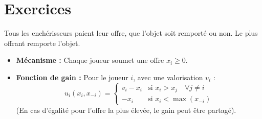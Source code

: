 \section{Exercices}

\begin{exemple}
Tous les enchérisseurs paient leur offre, que l'objet soit remporté ou non. Le plus offrant remporte l'objet.
\begin{itemize}
    \item \textbf{Mécanisme :} Chaque joueur soumet une offre $x_i \ge 0$.
    \item \textbf{Fonction de gain :} Pour le joueur $i$, avec une valorisation $v_i$ :
    \[ u_i(x_i, x_{-i}) = \begin{cases} v_i - x_i & \text{si } x_i > x_j \quad \forall j \neq i \\ -x_i & \text{si } x_i < \max(x_{-i}) \end{cases} \]
    (En cas d'égalité pour l'offre la plus élevée, le gain peut être partagé).
\end{itemize}
\end{exemple}

